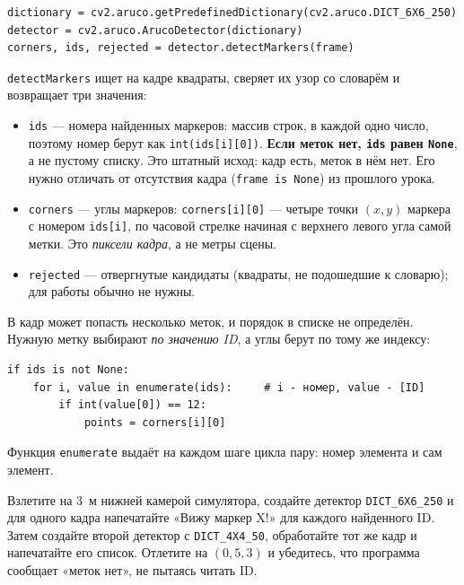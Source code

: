 \begin{codebox}[Детектор]
\begin{verbatim}
dictionary = cv2.aruco.getPredefinedDictionary(cv2.aruco.DICT_6X6_250)
detector = cv2.aruco.ArucoDetector(dictionary)
corners, ids, rejected = detector.detectMarkers(frame)
\end{verbatim}
\end{codebox}

\verb|detectMarkers| ищет на кадре квадраты, сверяет их узор со словарём и возвращает три значения:
\begin{itemize}
    \item \verb|ids| --- номера найденных маркеров: массив строк, в каждой одно число, поэтому номер берут как \verb|int(ids[i][0])|. \textbf{Если меток нет, \texttt{ids} равен \texttt{None}}, а не пустому списку. Это штатный исход: кадр есть, меток в нём нет. Его нужно отличать от отсутствия кадра (\verb|frame is None|) из прошлого урока.
    \item \verb|corners| --- углы маркеров: \verb|corners[i][0]| --- четыре точки $(x, y)$ маркера с номером \verb|ids[i]|, по часовой стрелке начиная с верхнего левого угла самой метки. Это \emph{пиксели кадра}, а не метры сцены.
    \item \verb|rejected| --- отвергнутые кандидаты (квадраты, не подошедшие к словарю); для работы обычно не нужны.
\end{itemize}

В кадр может попасть несколько меток, и порядок в списке не определён. Нужную метку выбирают \emph{по значению ID}, а углы берут по тому же индексу:

\begin{codebox}
\begin{verbatim}
if ids is not None:
    for i, value in enumerate(ids):     # i - номер, value - [ID]
        if int(value[0]) == 12:
            points = corners[i][0]
\end{verbatim}
\end{codebox}

Функция \verb|enumerate| выдаёт на каждом шаге цикла пару: номер элемента и сам элемент.

\begin{taskbox}
Взлетите на 3~м нижней камерой симулятора, создайте детектор \texttt{DICT\_6X6\_250} и для одного кадра напечатайте «Вижу маркер X!» для каждого найденного ID. Затем создайте второй детектор с \texttt{DICT\_4X4\_50}, обработайте тот же кадр и напечатайте его список. Отлетите на $(0, 5, 3)$ и убедитесь, что программа сообщает «меток нет», не пытаясь читать ID.
\end{taskbox}

